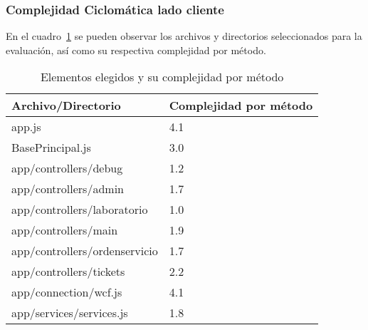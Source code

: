 \documentclass[letterpaper]{article}
\begin{document}
\subsubsection{Complejidad Ciclomática lado cliente}

En el cuadro~\ref{table:JSCC} se pueden observar los archivos y directorios 
seleccionados para la evaluación, así como su respectiva complejidad por método.
\begin{table}
    \centering
\tiny
    \begin{tabular}{|l|l|}
    \hline
    \textbf{Archivo/Directorio}            & \textbf{Complejidad por método} \\ \hline
    app.js                        & 4.1                    \\ \hline
    BasePrincipal.js              & 3.0                    \\ \hline
    app/controllers/debug         & 1.2                    \\ \hline
    app/controllers/admin         & 1.7                    \\ \hline
    app/controllers/laboratorio   & 1.0                    \\ \hline
    app/controllers/main          & 1.9                    \\ \hline
    app/controllers/ordenservicio & 1.7                    \\ \hline
    app/controllers/tickets       & 2.2                    \\ \hline
    app/connection/wcf.js         & 4.1                    \\ \hline
    app/services/services.js      & 1.8                    \\ \hline
    \end{tabular}
    \caption{Elementos elegidos y su complejidad por método}
    \label{table:JSCC}
\end{table}
\end{document}
